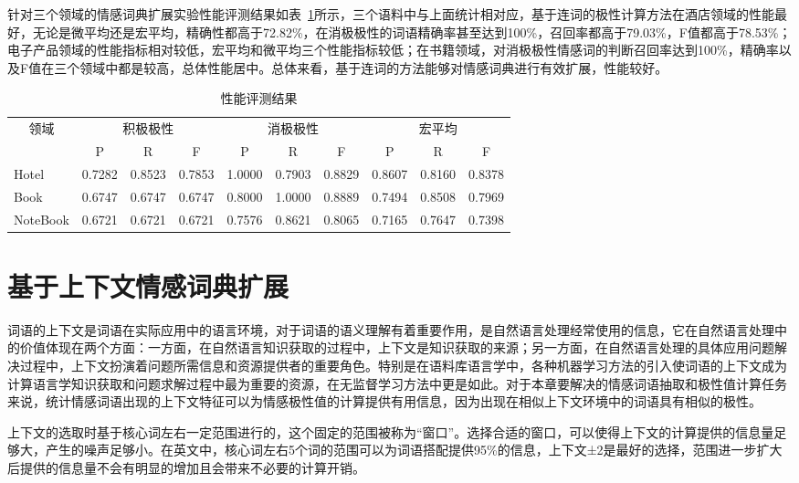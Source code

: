 针对三个领域的情感词典扩展实验性能评测结果如表~\ref{tab3-2-1}所示，三个语料中与上面统计相对应，基于连词的极性计算方法在酒店领域的性能最好，无论是微平均还是宏平均，精确性都高于72.82\%，在消极极性的词语精确率甚至达到100\%，召回率都高于79.03\%，F值都高于78.53\%；电子产品领域的性能指标相对较低，宏平均和微平均三个性能指标较低；在书籍领域，对消极极性情感词的判断召回率达到100\%，精确率以及F值在三个领域中都是较高，总体性能居中。总体来看，基于连词的方法能够对情感词典进行有效扩展，性能较好。
\begin{table}[htp]
\centering
\caption{性能评测结果}
\label{tab3-2-1}
\begin{tabular}{|l|l|l|l|l|l|l|l|l|l|}
\hline
\multicolumn{1}{|c|}{\multirow{2}{*}{领域}} & \multicolumn{3}{c|}{积极极性} & \multicolumn{3}{c|}{消极极性} & \multicolumn{3}{c|}{宏平均} \\ \cline{2-10} 
\multicolumn{1}{|c|}{} & \multicolumn{1}{c|}{P} & \multicolumn{1}{c|}{R} & \multicolumn{1}{c|}{F} & \multicolumn{1}{c|}{P} & \multicolumn{1}{c|}{R} & \multicolumn{1}{c|}{F} & \multicolumn{1}{c|}{P} & \multicolumn{1}{c|}{R} & \multicolumn{1}{c|}{F} \\ \hline
Hotel & 0.7282 & 0.8523 & 0.7853 & 1.0000 & 0.7903 & 0.8829 & 0.8607 & 0.8160 & 0.8378 \\ \hline
Book & 0.6747 & 0.6747 & 0.6747 & 0.8000 & 1.0000 & 0.8889 & 0.7494 & 0.8508 & 0.7969 \\ \hline
NoteBook & 0.6721 & 0.6721 & 0.6721 & 0.7576 & 0.8621 & 0.8065 & 0.7165 & 0.7647 & 0.7398 \\ \hline
\end{tabular}
\end{table}

\section{基于上下文情感词典扩展}
词语的上下文是词语在实际应用中的语言环境，对于词语的语义理解有着重要作用，是自然语言处理经常使用的信息，它在自然语言处理中的价值体现在两个方面：一方面，在自然语言知识获取的过程中，上下文是知识获取的来源；另一方面，在自然语言处理的具体应用问题解决过程中，上下文扮演着问题所需信息和资源提供者的重要角色。特别是在语料库语言学中，各种机器学习方法的引入使词语的上下文成为计算语言学知识获取和问题求解过程中最为重要的资源，在无监督学习方法中更是如此。对于本章要解决的情感词语抽取和极性值计算任务来说，统计情感词语出现的上下文特征可以为情感极性值的计算提供有用信息，因为出现在相似上下文环境中的词语具有相似的极性。

上下文的选取时基于核心词左右一定范围进行的，这个固定的范围被称为“窗口”。选择合适的窗口，可以使得上下文的计算提供的信息量足够大，产生的噪声足够小。在英文中，核心词左右5个词的范围可以为词语搭配提供95\%的信息，上下文±2是最好的选择，范围进一步扩大后提供的信息量不会有明显的增加且会带来不必要的计算开销。


